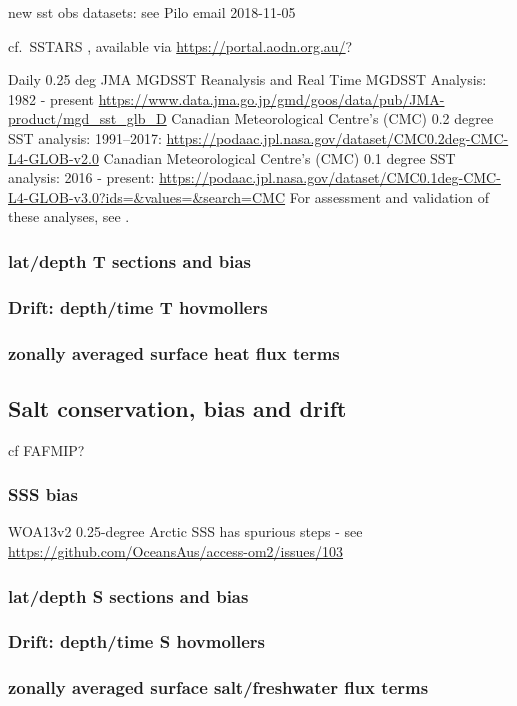 \documentclass[11pt]{article}
\begin{document}
new sst obs datasets: see Pilo email 2018-11-05

cf.\ SSTARS \citep{WijffelsETAL2018a}, available via \url{https://portal.aodn.org.au/}?

Daily 0.25 deg JMA MGDSST Reanalysis and Real Time MGDSST Analysis: 1982 - present
\url{https://www.data.jma.go.jp/gmd/goos/data/pub/JMA-product/mgd_sst_glb_D}
Canadian Meteorological Centre's (CMC) 0.2 degree SST analysis: 1991--2017:
\url{https://podaac.jpl.nasa.gov/dataset/CMC0.2deg-CMC-L4-GLOB-v2.0}
Canadian Meteorological Centre's (CMC) 0.1 degree SST analysis: 2016 - present:
\url{https://podaac.jpl.nasa.gov/dataset/CMC0.1deg-CMC-L4-GLOB-v3.0?ids=&values=&search=CMC}
 For assessment and validation of these analyses, see \citet{FiedlerETAL2019a}.
 

\subsubsection{lat/depth T sections and bias}
\subsubsection{Drift: depth/time T hovmollers}
\subsubsection{zonally averaged surface heat flux terms}

\subsection{Salt conservation, bias and drift}
cf FAFMIP? \citet{GregoryETAL2016a}
\subsubsection{SSS bias}
WOA13v2 0.25-degree Arctic SSS has spurious steps - see \url{https://github.com/OceansAus/access-om2/issues/103}
\subsubsection{lat/depth S sections and bias}
\subsubsection{Drift: depth/time S hovmollers}
\subsubsection{zonally averaged surface salt/freshwater flux terms}
\end{document}
